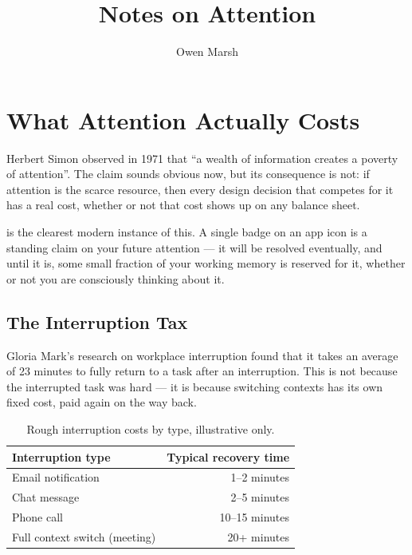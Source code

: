 \documentclass[justified,notoc]{xtufte-book}
\title[Notes on Attention]{Notes on Attention}
\author[Owen Marsh]{Owen Marsh}
\begin{document}
\maketitlepage

\tableofcontents

\chapter{What Attention Actually Costs}

Herbert Simon observed in 1971 that ``a wealth of information creates
a poverty of attention''\cite{simon1971designing}. The claim sounds obvious now, but
its consequence is not: if attention is the scarce resource, then
every design decision that competes for it has a real cost, whether or
not that cost shows up on any balance sheet.

 is the clearest modern instance of
this. A single badge on an app icon is a standing claim on your future
attention — it will be resolved eventually, and until it is, some
small fraction of your working memory is reserved for it, whether or
not you are consciously thinking about it.

\begin{marginfigure}
\caption{A schematic: each open notification is a small, ongoing tax
on working memory, not a one-time cost.}
\end{marginfigure}

\section{The Interruption Tax}

Gloria Mark's research on workplace interruption found that it takes
an average of 23 minutes to fully return to a task after an
interruption\cite{mark2008cost}. This is not because the interrupted task
was hard — it is because switching contexts has its own fixed cost,
paid again on the way back.

\begin{table}
\centering
\caption{Rough interruption costs by type, illustrative only.}
\begin{tabular}{@{}lr@{}}
\toprule
Interruption type & Typical recovery time \\
\midrule
Email notification & 1--2 minutes \\
Chat message & 2--5 minutes \\
Phone call & 10--15 minutes \\
Full context switch (meeting) & 20+ minutes \\
\bottomrule
\end{tabular}
\end{table}
\end{document}
